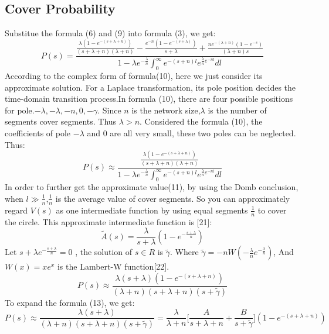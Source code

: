 \documentclass[10pt]{article}
\begin{document}
\subsection{Cover Probability}
Substitue the formula (6) and (9) into formula (3), we get:
\begin{equation}
    P(s)=\frac{\frac{\lambda (1-e^{-(s+\lambda +n)})}{(s+\lambda +n)(\lambda +n)}-\frac{e^{-n}(1-e^{-(s+\lambda)})}{s+\lambda }+\frac{ne^{-(\lambda +n)}(1-e^{-s})}{(\lambda +n)s}}{1-\lambda e^{-\frac{\lambda}{n}}\int_{0}^{\infty}e^{-(s+n)l}e^{\frac{\lambda}{n}e^{-nl}}dl}
\end{equation}
According to the complex form of formula(10), here we just consider its approximate solution. For a Laplace transformation, its pole position decides the time-domain transition process.In formula (10), there are four  possible positions for pole.$-\lambda , -\lambda ,-n,0,-\gamma$. Since $n$ is the network size,$\lambda$ is the number of segments cover segments. Thus $\lambda>n$. Considered the formula (10), the coefficients of pole $-\lambda$ and 0 are all very small, these two poles can be neglected. Thus:
\begin{equation}
    P(s)\approx \frac{\frac{\lambda (1-e^{-(s+\lambda +n)})}{(s+\lambda +n)(\lambda +n)}}{1-\lambda e^{-\frac{\lambda}{n}}\int _{0}^{\infty}e^{-(s+n)l}e^{\frac{\lambda}{n}e^{-nl}}dl}
\end{equation}
In order to further get the approximate value(11), by using the Domb conclusion, when $l\gg \frac{1}{n}$,$\frac{1}{n}$ is the average value of cover segments. So you can approximately regard $V(s)$ as one intermediate function by using equal segments $\frac{1}{n}$ to cover the circle. This approximate intermediate function is [21]: 
\begin{equation}
    \widetilde{A}(s)=\frac{\lambda}{s+\lambda }(1-e^{-\frac{s+\lambda }{n}})
\end{equation}
Let $s+\lambda e^{-\frac{s+\lambda }{n}}=0$ , the solution of $s\in R$ is $\widetilde{\gamma}$. Where $\widetilde{\gamma}=-nW(-\frac{\lambda}{n}e^{-\frac{\lambda}{n}})$, And $W(x)=xe^{x}$ is the  Lambert-W function[22].
\begin{equation}
    P(s)\approx \frac{\lambda (s+\lambda )(1-e^{-(s+\lambda +n)})}{(\lambda +n)(s+\lambda +n)(s+\widetilde{\gamma})}
\end{equation}
To expand the formula (13), we get:
\begin{equation}
    P(s)\approx \frac{\lambda (s+\lambda)}{(\lambda +n)(s+\lambda +n)(s+\widetilde{\gamma})}=\frac{\lambda}{\lambda +n}\lbrack \frac{A}{s+\lambda +n}+\frac{B}{s+\widetilde{\gamma}} \rbrack (1-e^{-(s+\lambda +n)})
\end{equation}
\end{document}
